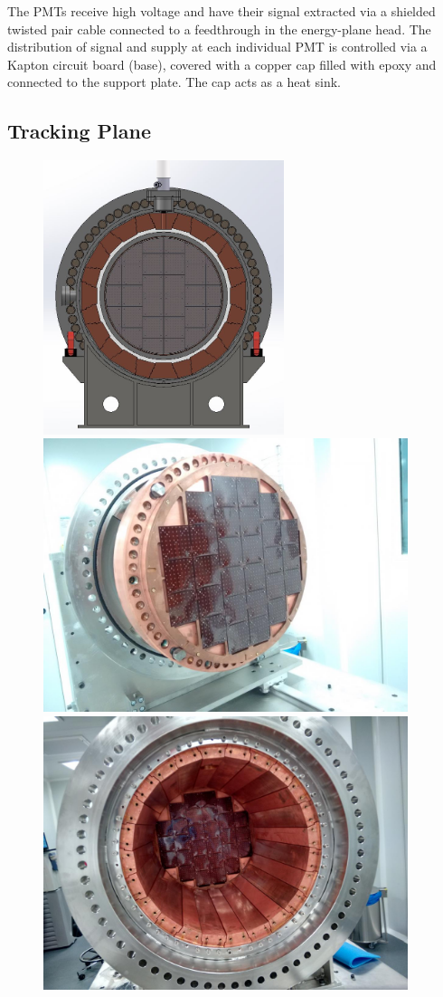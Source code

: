 The PMTs receive high voltage and have their signal extracted via a
shielded twisted pair cable connected to a feedthrough in the energy-plane head. The distribution of
signal and supply at each individual PMT is controlled via a
Kapton circuit board (base), covered with a
copper cap filled with epoxy and connected to the support plate. The cap acts as a heat sink.


\subsection{Tracking Plane}

\begin{figure}[hpt!]
\centering
\includegraphics[height=8cm]{img2/TrackingPlane.png}
\includegraphics[height=8cm]{img2/TPI1.png}
\includegraphics[height=8cm]{img2/TrackingPlaneFromEP.png}


\end{figure}
